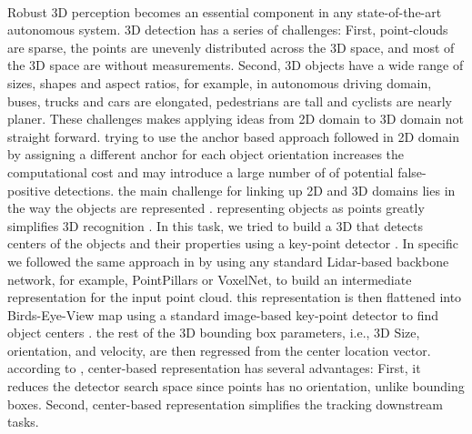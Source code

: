 \documentclass[10pt,twocolumn,letterpaper]{article}
\begin{document}
\paragraph{}
Robust 3D perception becomes an essential component in any state-of-the-art autonomous system. 3D detection has a series of challenges: First, point-clouds are sparse, the points are unevenly distributed across the 3D space, and most of the 3D space are without measurements. Second, 3D objects have a wide range of sizes, shapes and aspect ratios, for example, in autonomous driving domain, buses, trucks and cars are elongated, pedestrians are tall and cyclists are nearly planer. These challenges makes applying ideas from 2D domain to 3D domain not straight forward. trying to use the anchor based approach followed in 2D domain by assigning a different anchor for each object orientation increases the computational cost and may introduce a large number of of potential false-positive detections. the main challenge for linking up 2D and 3D domains lies in the way the objects are represented \cite{yang20203dssd}. representing objects as points greatly simplifies 3D recognition \cite{yin2020center}. In this task, we tried to build a 3D that detects centers of the objects and their properties using a key-point detector \cite{zhou2019objects}. In specific we followed the same approach in \cite{yin2020center, ge2020afdet} by using any standard Lidar-based backbone network, for example, PointPillars or VoxelNet, to build an intermediate representation for the input point cloud. this representation is then flattened into Birds-Eye-View map using a standard image-based key-point detector to find object centers \cite{zhou2019objects}. the rest of the 3D bounding box parameters, i.e., 3D Size, orientation, and velocity, are then regressed from the center location vector. according to \cite{yin2020center}, center-based representation has several advantages: First, it reduces the detector search space since points has no orientation, unlike bounding boxes. Second, center-based representation simplifies the tracking downstream tasks. 
\end{document}
